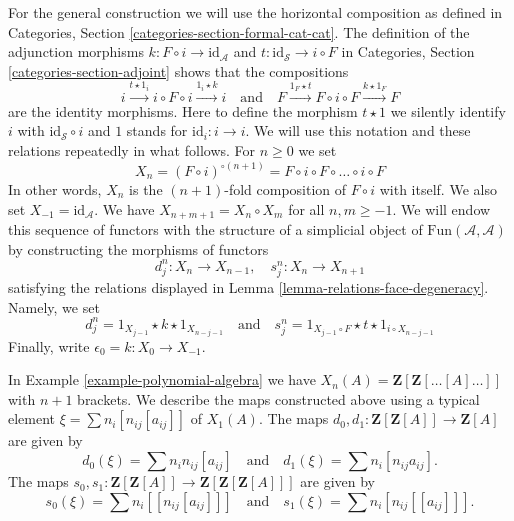 \noindent
For the general construction we will use the horizontal composition as
defined in Categories, Section \ref{categories-section-formal-cat-cat}.
The definition of the adjunction morphisms
$k : F \circ i \to \text{id}_\mathcal{A}$ and
$t : \text{id}_\mathcal{S} \to i \circ F$
in Categories, Section \ref{categories-section-adjoint}
shows that the compositions
\begin{equation}
\label{equation-composition}
i \xrightarrow{t \star 1_i} i \circ F \circ i \xrightarrow{1_i \star k} i
\quad\text{and}\quad
F \xrightarrow{1_F \star t} F \circ i \circ F \xrightarrow{k \star 1_F} F
\end{equation}
are the identity morphisms. Here to define the morphism $t \star 1$ we
silently identify $i$ with $\text{id}_\mathcal{S} \circ i$ and
$1$ stands for $\text{id}_i : i \to i$. We will use this notation and
these relations repeatedly in what follows.
For $n \geq 0$ we set
$$
X_n = (F \circ i)^{\circ (n + 1)} =
F \circ i \circ F \circ \ldots \circ i \circ F
$$
In other words, $X_n$ is the $(n + 1)$-fold composition of $F \circ i$
with itself. We also set $X_{-1} = \text{id}_\mathcal{A}$.
We have $X_{n + m + 1} = X_n \circ X_m$ for all $n, m \geq -1$.
We will endow this sequence of functors with the structure of a
simplicial object of $\text{Fun}(\mathcal{A}, \mathcal{A})$ by constructing
the morphisms of functors
$$
d^n_j : X_n \to X_{n - 1},\quad s^n_j : X_n \to X_{n + 1}
$$
satisfying the relations displayed in
Lemma \ref{lemma-relations-face-degeneracy}.
Namely, we set
$$
d^n_j = 1_{X_{j - 1}} \star k \star 1_{X_{n - j - 1}}
\quad\text{and}\quad
s^n_j = 1_{X_{j - 1} \circ F} \star t \star 1_{i \circ X_{n - j - 1}}
$$
Finally, write $\epsilon_0 = k : X_0 \to X_{-1}$.

\begin{example}
\label{example-polynomial-algebra-maps}
In Example \ref{example-polynomial-algebra} we have
$X_n(A) = \mathbf{Z}[\mathbf{Z}[\ldots [A]\ldots]]$ with
$n + 1$ brackets. We describe the maps constructed above
using a typical element $\xi = \sum n_i[n_{ij}[a_{ij}]]$
of $X_1(A)$. The maps
$d_0, d_1 : \mathbf{Z}[\mathbf{Z}[A]] \to \mathbf{Z}[A]$
are given by
$$
d_0(\xi) = \sum n_in_{ij}[a_{ij}]
\quad\text{and}\quad
d_1(\xi) = \sum n_i[n_{ij}a_{ij}].
$$
The maps
$s_0, s_1 : \mathbf{Z}[\mathbf{Z}[A]] \to
\mathbf{Z}[\mathbf{Z}[\mathbf{Z}[A]]]$
are given by
$$
s_0(\xi) = \sum n_i[[n_{ij}[a_{ij}]]]
\quad\text{and}\quad
s_1(\xi) = \sum n_i[n_{ij}[[a_{ij}]]].
$$
\end{example}

